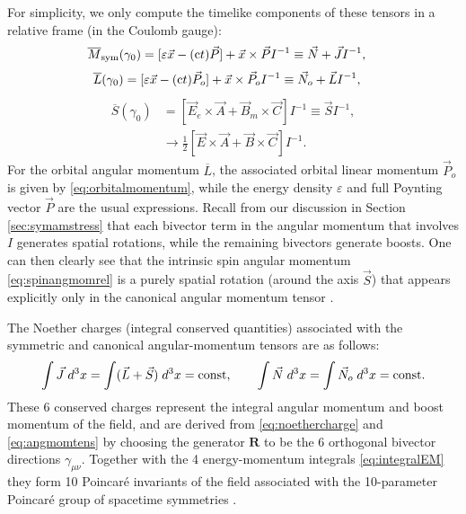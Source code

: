 \documentclass[1p,sort&compress]{elsarticle}
\numberwithin{equation}{section}
\newcommand{\rv}[1]{\vec{#1}}
\newcommand{\bv}[1]{\mathbf{#1}}
\newcommand{\cc}{{\rm c}}
\begin{document}
For simplicity, we only compute the timelike components of these tensors in a relative frame (in the Coulomb gauge):
\begin{align}\label{eq:angmomrel}
  \overline{M}_{\text{sym}}(\gamma_0) &= [\varepsilon \rv{x} - (\cc t)\rv{P}] + \rv{x}\times\rv{P} I^{-1} \equiv \vec{N}+\vec{J} I^{-1}, 
\end{align}
\begin{align}
  \label{eq:orbangmomrel}
  \overline{L}(\gamma_0) &= [\varepsilon \rv{x} - (\cc t)\rv{P}_o] + \rv{x}\times\rv{P}_o I^{-1}\equiv \vec{N}_o+\vec{L} I^{-1},
\end{align}
\begin{align}
  \label{eq:spinangmomrel}
  \overline{S}(\gamma_0) & = \left[\rv{E}_e\times\rv{A} + \rv{B}_m\times\rv{C}\right] I^{-1} \equiv \vec{S} I^{-1}, \\
  &\to \frac{1}{2}[\rv{E}\times\rv{A} + \rv{B}\times\rv{C}]I^{-1}. \nonumber
\end{align}
For the orbital angular momentum $\overline{L}$, the associated orbital linear momentum $\rv{P}_o$ is given by \eqref{eq:orbitalmomentum}, while the energy density $\varepsilon$ and full Poynting vector $\rv{P}$ are the usual expressions.  
Recall from our discussion in Section \ref{sec:symamstress} that each bivector term in the angular momentum that involves $I$ generates spatial rotations, while the remaining bivectors generate boosts. One can then clearly see that the intrinsic spin angular momentum \eqref{eq:spinangmomrel} is a purely spatial rotation (around the axis $\rv{S}$) that appears explicitly only in the canonical angular momentum tensor \cite{Bliokh2013}. 

The Noether charges (integral conserved quantities) associated with the symmetric and canonical angular-momentum tensors are as follows:
\begin{align}\label{eq:integralAM}
\int \vec{J} \; d^3x = \int (\vec{L}+\vec{S}) \; d^3x = {\rm const},~~~~~~ \int \vec{N} \; d^3x = \int \vec{N}_o \; d^3x = {\rm const}.
\end{align}
These 6 conserved charges represent the integral angular momentum and boost momentum of the field, and are derived from \eqref{eq:noethercharge} and \eqref{eq:angmomtens} by choosing the generator $\bv{R}$ to be the 6 orthogonal bivector directions $\gamma_{\mu\nu}$.
Together with the 4 energy-momentum integrals \eqref{eq:integralEM} they form 10 Poincar\'{e} invariants of the field associated with the 10-parameter Poincar\'{e} group of spacetime symmetries \cite{Bialynicki-Birula1996,Thide2014,Soper1976,Bliokh2013}.
\end{document}

